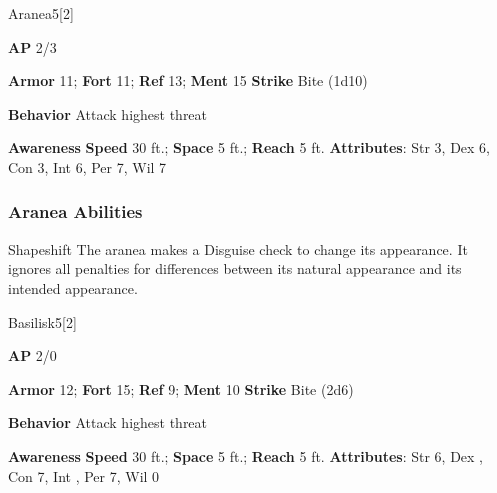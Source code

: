 \begin{monsection}{Aranea}{5}[2]
\vspace{-1em}\vspace{-1em}
\begin{spellcontent}
\begin{spelltargetinginfo}
{\textbf{AP} 2/3}

\pari \textbf{Armor} 11;
\textbf{Fort} 11;
\textbf{Ref} 13;
\textbf{Ment} 15
\pari \textbf{Strike} Bite  (1d10)



\pari \textbf{Behavior} Attack highest threat
\end{spelltargetinginfo}
\end{spellcontent}

\begin{monsterfooter}
\pari \textbf{Awareness} 
\pari \textbf{Speed} 30 ft.;
\textbf{Space} 5 ft.;
\textbf{Reach} 5 ft.
\pari \textbf{Attributes}:
Str 3,
Dex 6,
Con 3,
Int 6,
Per 7,
Wil 7
\end{monsterfooter}
\end{monsection}


\subsubsection{Aranea Abilities}

\begin{freeability}{Shapeshift}
The aranea makes a Disguise check to change its appearance.
It ignores all penalties for differences between its natural appearance and its intended appearance.
\end{freeability}

\begin{monsection}{Basilisk}{5}[2]
\vspace{-1em}\vspace{-1em}
\begin{spellcontent}
\begin{spelltargetinginfo}
{\textbf{AP} 2/0}

\pari \textbf{Armor} 12;
\textbf{Fort} 15;
\textbf{Ref} 9;
\textbf{Ment} 10
\pari \textbf{Strike} Bite  (2d6)



\pari \textbf{Behavior} Attack highest threat
\end{spelltargetinginfo}
\end{spellcontent}

\begin{monsterfooter}
\pari \textbf{Awareness} 
\pari \textbf{Speed} 30 ft.;
\textbf{Space} 5 ft.;
\textbf{Reach} 5 ft.
\pari \textbf{Attributes}:
Str 6,
Dex ,
Con 7,
Int ,
Per 7,
Wil 0
\end{monsterfooter}
\end{monsection}


